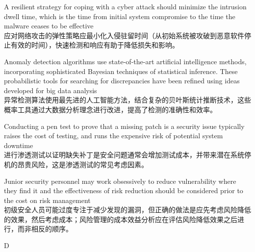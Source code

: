 \documentclass{article}
\begin{document}
\begin{choices}
    \item A resilient strategy for coping with a cyber attack should minimize the intrusion dwell time, which is the time from initial system compromise to the time the malware ceases to be effective\\
    应对网络攻击的弹性策略应最小化入侵驻留时间（从初始系统被攻破到恶意软件停止有效的时间），快速检测和响应有助于降低损失和影响。
    \item Anomaly detection algorithms use state-of-the-art artificial intelligence methods, incorporating sophisticated Bayesian techniques of statistical inference. These probabilistic tools for searching for discrepancies have been refined using ideas developed for big data analysis\\
    异常检测算法使用最先进的人工智能方法，结合复杂的贝叶斯统计推断技术，这些概率工具通过大数据分析理念进行改进，提高了检测的准确性和效率。
    \item Conducting a pen test to prove that a missing patch is a security issue typically raises the cost of testing, and runs the expensive risk of potential system downtime\\
    进行渗透测试以证明缺失补丁是安全问题通常会增加测试成本，并带来潜在系统停机的昂贵风险，这是渗透测试的常见考虑因素。
    \item Junior security personnel may work obsessively to reduce vulnerability where they find it and the effectiveness of risk reduction should be considered prior to the cost on risk management\\
    初级安全人员可能过度专注于减少发现的漏洞，但正确的做法是应先考虑风险降低的效果，然后考虑成本；风险管理的成本效益分析应在评估风险降低效果之后进行，而非相反的顺序。
\end{choices}

\begin{correctanswer}
    D
\end{correctanswer}
\end{document}
